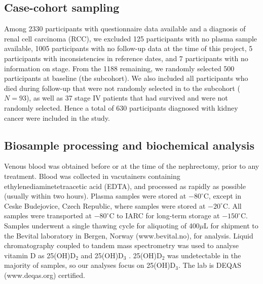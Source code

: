 \documentclass[a4paper,11pt]{article}
\renewcommand{\cite}{\citep}
\begin{document}
\subsection*{Case-cohort sampling}
Among 2330 participants with questionnaire data available and a diagnosis of 
renal cell carcinoma (RCC), we excluded 125 participants 
with no plasma sample available, 1005 participants with no follow-up data at 
the time of this project, 5 participants with inconsistencies in reference 
dates, and 7 participants with no information on stage. From the 1188 
remaining, we randomly selected 500 participants at baseline (the subcohort). 
We also included all participants who died during follow-up that were not 
randomly selected in to the subcohort ($N=93$), as well as 37 stage IV patients 
that had survived and were not randomly selected. Hence a total of 
630 participants diagnosed with kidney cancer were included in the study.

\subsection*{Biosample processing and biochemical analysis}
Venous blood was obtained before or at the time of the nephrectomy, prior to 
any treatment. Blood was collected in vacutainers containing 
ethylenediaminetetraacetic acid (EDTA), and processed as rapidly as possible 
(usually within two hours). Plasma samples were stored at $-80^{\circ}$C, 
except in Ceske Budejovice, Czech Republic, where samples were stored at 
$-20^{\circ}$C. All samples were transported at $-80^{\circ}$C to IARC for 
long-term storage at $-150^{\circ}$C. Samples underwent a single thawing cycle 
for aliquoting of 400$\mu$L for shipment to the Bevital laboratory in Bergen, 
Norway (www.bevital.no), for analysis. Liquid chromatography coupled to tandem 
mass spectrometry was used to analyse vitamin D as 25(OH)D$_2$ and 
25(OH)D$_3$ \cite{midttun_determination_2011}. 25(OH)D$_2$ was undetectable in 
the majority of samples, so our analyses focus on 25(OH)D$_3$. The lab is DEQAS 
(www.deqas.org) certified.
\end{document}

